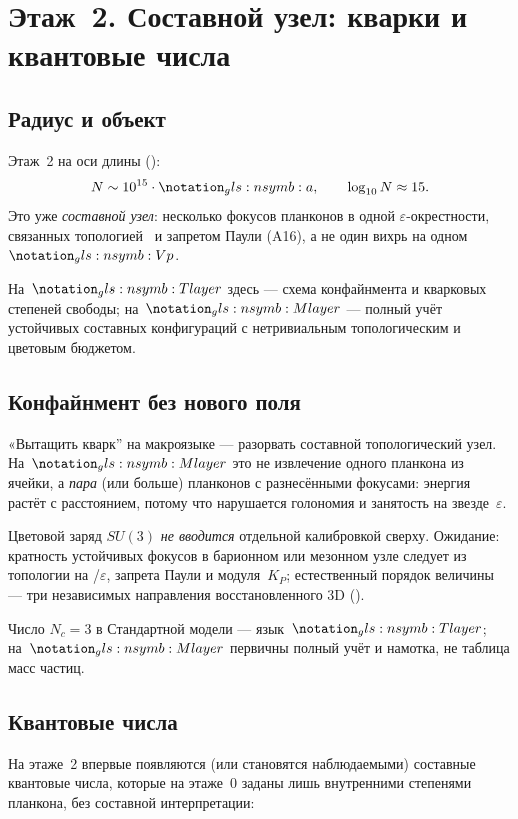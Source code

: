 \chapter{Этаж~2. Составной узел: кварки и квантовые числа}
\label{ch:floor2}

\section{Радиус и объект}
\label{sec:floor2-scale}

Этаж~2 на оси длины ():
\[
  N\sim 10^{15}\cdot\caStepSpace,\qquad \log_{10}N\approx 15.
\]
Это уже \emph{составной узел}: несколько фокусов планконов в одной $\varepsilon$-окрестности,
связанных топологией \latGCKshort\ и запретом Паули (A16), а не один вихрь на одном~$\hv$.

На~$\layerMacro$ здесь --- схема конфайнмента и кварковых степеней свободы;
на~$\layerMicro$ --- полный учёт устойчивых составных конфигураций с нетривиальным
топологическим и цветовым бюджетом.

\section{Конфайнмент без нового поля}
\label{sec:floor2-confinement}

«Вытащить кварк'' на макроязыке --- разорвать составной топологический узел.
На~$\Mlayer$ это не извлечение одного планкона из ячейки, а
\emph{пара} (или больше) планконов с разнесёнными фокусами:
энергия растёт с расстоянием, потому что нарушается голономия и занятость на звезде~$\varepsilon$.

Цветовой заряд $SU(3)$ \emph{не вводится} отдельной калибровкой сверху.
Ожидание: кратность устойчивых фокусов в барионном или мезонном узле
следует из топологии на \latGCKshort/$\varepsilon$, запрета Паули и модуля~$K_P$;
естественный порядок величины --- три независимых направления восстановленного $3$D
().

Число $N_c=3$ в Стандартной модели --- язык~$\layerMacro$; на~$\layerMicro$ первичны полный учёт и намотка,
не таблица масс частиц.

\section{Квантовые числа}
\label{sec:floor2-quantum-numbers}

На этаже~2 впервые появляются (или становятся наблюдаемыми) составные квантовые числа,
которые на этаже~0 заданы лишь внутренними степенями планкона, без составной интерпретации:

